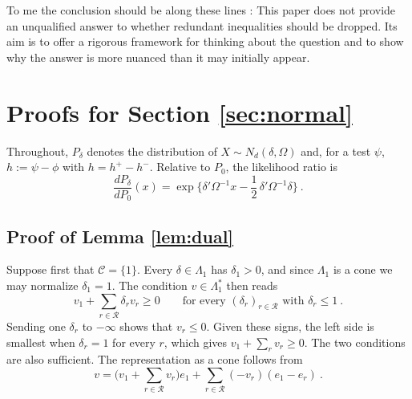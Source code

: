 \documentclass[11pt]{article}
\numberwithin{equation}{section}
\theoremstyle{definition}
\begin{document}
To me the conclusion should be along these lines : This paper does not provide an unqualified answer to whether redundant inequalities should be dropped. Its aim is to offer a rigorous framework for thinking about the question and to show why the answer is more nuanced than it may initially appear. 

\newpage 
\appendices
\color{black}\hypersetup{allcolors=black}

\renewcommand{\theequation}{\Alph{section}-\arabic{equation}}
\setcounter{equation}{0}

\section{Proofs for Section \ref{sec:normal}}\label{app:proofs-normal}


Throughout, $P_\delta$ denotes the distribution of $X\sim N_d(\delta,\Omega)$ and, for a test $\psi$, $h:=\psi-\phi$ with $h=h^+-h^-$. Relative to $P_0$, the likelihood ratio is
\begin{equation}\label{eq:lr}
\frac{dP_\delta}{dP_0}(x)=\exp\Big\{\delta'\Omega^{-1}x-\frac12\,\delta'\Omega^{-1}\delta\Big\}~.
\end{equation}

\subsection{Proof of Lemma \ref{lem:dual}}

Suppose first that $\mathcal C=\{1\}$. Every $\delta\in\Lambda_1$ has $\delta_1>0$, and since $\Lambda_1$ is a cone we may normalize $\delta_1=1$. The condition $v\in\Lambda_1^*$ then reads
\[
v_1+\sum_{r\in\mathcal R}\delta_rv_r\ge0
\qquad\text{for every }(\delta_r)_{r\in\mathcal R}\text{ with }\delta_r\le1~.
\]
Sending one $\delta_r$ to $-\infty$ shows that $v_r\le0$. Given these signs, the left side is smallest when $\delta_r=1$ for every $r$, which gives $v_1+\sum_rv_r\ge0$. The two conditions are also sufficient. The representation as a cone follows from
\[
v=\Big(v_1+\sum_{r\in\mathcal R}v_r\Big)e_1+\sum_{r\in\mathcal R}(-v_r)(e_1-e_r)~.
\]
\end{document}
